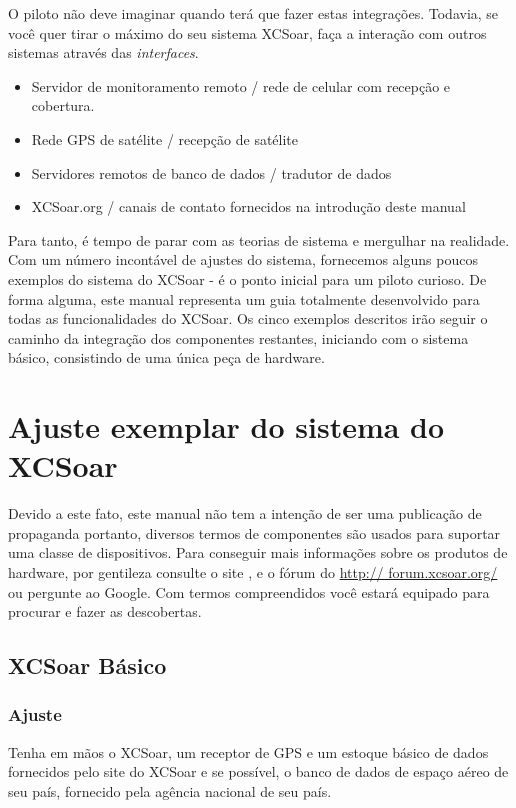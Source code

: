 O piloto não deve imaginar quando terá que fazer estas integrações.  Todavia, se você quer tirar o máximo do seu sistema XCSoar, faça a interação com outros sistemas através das \emph{interfaces}.
\begin{itemize}
\item Servidor de monitoramento remoto / rede de celular com recepção e cobertura.
\item Rede GPS de satélite / recepção de satélite
\item Servidores remotos de banco de dados / tradutor de dados
\item XCSoar.org / canais de contato fornecidos na introdução deste manual
\end{itemize}
Para tanto, é tempo de parar com as teorias de sistema e mergulhar na realidade. Com um número incontável de ajustes do sistema, fornecemos alguns poucos exemplos do sistema do XCSoar - é o ponto inicial para um piloto curioso.  De forma alguma, este manual representa um guia totalmente desenvolvido para todas as funcionalidades do XCSoar. Os cinco exemplos descritos irão seguir o caminho da integração dos componentes restantes, iniciando com o sistema básico, consistindo de uma única peça de hardware. 

\section{Ajuste exemplar do sistema do XCSoar}
Devido a este fato, este manual não tem a intenção de ser uma publicação de propaganda portanto, diversos termos de componentes são usados para suportar uma classe de dispositivos. Para conseguir mais informações sobre os produtos de hardware, por gentileza consulte o site 
, e o fórum do  \url{http://
forum.xcsoar.org/} ou pergunte ao Google. Com termos compreendidos você estará equipado para procurar e fazer as descobertas. 

\subsection*{XCSoar Básico}
\subsubsection*{Ajuste} Tenha em mãos o XCSoar, um receptor de GPS e um estoque básico de dados fornecidos pelo site do XCSoar e se possível, o banco de dados de espaço aéreo de seu país, fornecido pela agência nacional de seu país.

